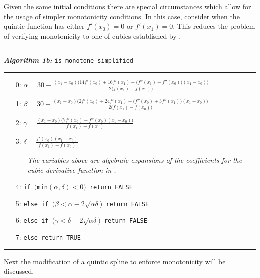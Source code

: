 \documentclass{scspaperproc}
\theoremstyle{scsthe}
\begin{document}
Given the same initial conditions there are special circumstances which allow for the usage of simpler monotonicity conditions. In this case, consider when the quintic function has either $f'(x_0) = 0$ or $f'(x_1) = 0.$ This reduces the problem of verifying monotonicity to one of cubics established by \cite{schmidt1988positivity}.

\vspace{10pt}%
\hrule%
\vspace{3pt}%
\noindent\textbf{\textit{Algorithm 1b:}} \texttt{is\_monotone\_simplified}%
\vspace{3pt}%
\hrule%
\begin{itemize}
  \itemsep0pt
  \parskip0pt

\item[0:] $\alpha = 30 - \frac{(x_1 - x_0)\big( 14 f'(x_0) + 16 f'(x_1) - \big(f''(x_1) - f''(x_0) \big) (x_1 - x_0)\big)}{2\big(f(x_1) - f(x_0)\big)}$
\item[1:] $\beta = 30 - \frac{(x_1 - x_0)\big( 2 f'(x_0) + 24 f'(x_1) - \big(f''(x_0) + 3 f''(x_1) \big) (x_1 - x_0)\big)}{2\big(f(x_1) - f(x_0)\big)}$
\item[2:] $\gamma = \frac{(x_1 - x_0)\big( 7 f'(x_0) + f''(x_0) (x_1 - x_0) \big)}{f(x_1) - f(x_0)}$
\item[3:] $\delta = \frac{f'(x_0) (x_1 - x_0)}{f(x_1) - f(x_0)}$

  \begin{itemize}
    \item[] \textit{The variables above are algebraic expansions of the coefficients for the cubic derivative function in \cite{schmidt1988positivity}.}
  \end{itemize}

\item[4:] \texttt{if $\big($min$(\alpha, \delta) < 0\big)$ return FALSE}
\item[5:] \texttt{else if $\big(\beta < \alpha - 2 \sqrt{\alpha \delta}\big)$ return FALSE}
\item[6:] \texttt{else if $\big(\gamma < \delta - 2 \sqrt{\alpha \delta}\big)$ return FALSE}
\item[7:] \texttt{else return TRUE}

\end{itemize}
\hrule
\vspace{10pt}

Next the modification of a quintic spline to enforce monotonicity will be discussed.
\end{document}
